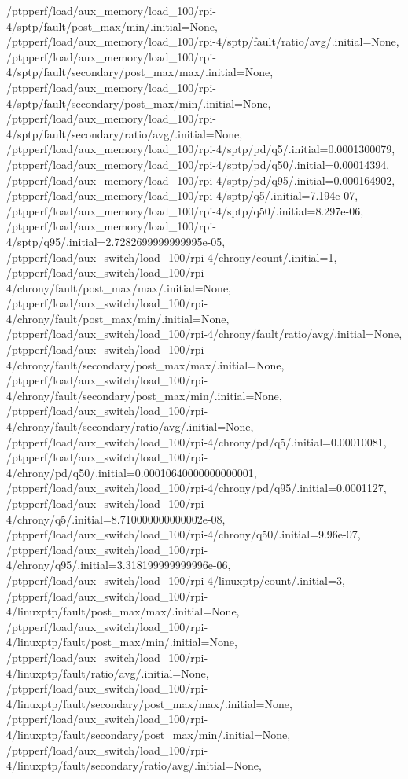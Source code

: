 {    /ptpperf/load/aux_memory/load_100/rpi-4/sptp/fault/post_max/min/.initial=None,
    /ptpperf/load/aux_memory/load_100/rpi-4/sptp/fault/ratio/avg/.initial=None,
    /ptpperf/load/aux_memory/load_100/rpi-4/sptp/fault/secondary/post_max/max/.initial=None,
    /ptpperf/load/aux_memory/load_100/rpi-4/sptp/fault/secondary/post_max/min/.initial=None,
    /ptpperf/load/aux_memory/load_100/rpi-4/sptp/fault/secondary/ratio/avg/.initial=None,
    /ptpperf/load/aux_memory/load_100/rpi-4/sptp/pd/q5/.initial=0.0001300079,
    /ptpperf/load/aux_memory/load_100/rpi-4/sptp/pd/q50/.initial=0.00014394,
    /ptpperf/load/aux_memory/load_100/rpi-4/sptp/pd/q95/.initial=0.000164902,
    /ptpperf/load/aux_memory/load_100/rpi-4/sptp/q5/.initial=7.194e-07,
    /ptpperf/load/aux_memory/load_100/rpi-4/sptp/q50/.initial=8.297e-06,
    /ptpperf/load/aux_memory/load_100/rpi-4/sptp/q95/.initial=2.7282699999999995e-05,
    /ptpperf/load/aux_switch/load_100/rpi-4/chrony/count/.initial=1,
    /ptpperf/load/aux_switch/load_100/rpi-4/chrony/fault/post_max/max/.initial=None,
    /ptpperf/load/aux_switch/load_100/rpi-4/chrony/fault/post_max/min/.initial=None,
    /ptpperf/load/aux_switch/load_100/rpi-4/chrony/fault/ratio/avg/.initial=None,
    /ptpperf/load/aux_switch/load_100/rpi-4/chrony/fault/secondary/post_max/max/.initial=None,
    /ptpperf/load/aux_switch/load_100/rpi-4/chrony/fault/secondary/post_max/min/.initial=None,
    /ptpperf/load/aux_switch/load_100/rpi-4/chrony/fault/secondary/ratio/avg/.initial=None,
    /ptpperf/load/aux_switch/load_100/rpi-4/chrony/pd/q5/.initial=0.00010081,
    /ptpperf/load/aux_switch/load_100/rpi-4/chrony/pd/q50/.initial=0.00010640000000000001,
    /ptpperf/load/aux_switch/load_100/rpi-4/chrony/pd/q95/.initial=0.0001127,
    /ptpperf/load/aux_switch/load_100/rpi-4/chrony/q5/.initial=8.710000000000002e-08,
    /ptpperf/load/aux_switch/load_100/rpi-4/chrony/q50/.initial=9.96e-07,
    /ptpperf/load/aux_switch/load_100/rpi-4/chrony/q95/.initial=3.318199999999996e-06,
    /ptpperf/load/aux_switch/load_100/rpi-4/linuxptp/count/.initial=3,
    /ptpperf/load/aux_switch/load_100/rpi-4/linuxptp/fault/post_max/max/.initial=None,
    /ptpperf/load/aux_switch/load_100/rpi-4/linuxptp/fault/post_max/min/.initial=None,
    /ptpperf/load/aux_switch/load_100/rpi-4/linuxptp/fault/ratio/avg/.initial=None,
    /ptpperf/load/aux_switch/load_100/rpi-4/linuxptp/fault/secondary/post_max/max/.initial=None,
    /ptpperf/load/aux_switch/load_100/rpi-4/linuxptp/fault/secondary/post_max/min/.initial=None,
    /ptpperf/load/aux_switch/load_100/rpi-4/linuxptp/fault/secondary/ratio/avg/.initial=None,
}
